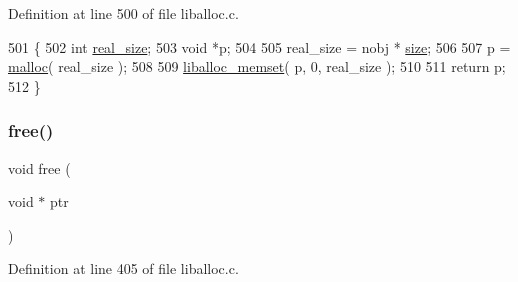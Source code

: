 Definition at line 500 of file liballoc.\+c.


\begin{DoxyCode}
501 \{
502        \textcolor{keywordtype}{int} \hyperlink{a00095_ad22b1c69bdce419783ac165f7f354245_ad22b1c69bdce419783ac165f7f354245}{real\_size};
503        \textcolor{keywordtype}{void} *p;
504 
505        real\_size = nobj * \hyperlink{a00095_a29b056a39f6022d32468e7913e6df936_a29b056a39f6022d32468e7913e6df936}{size};
506        
507        p = \hyperlink{a00023_a7ac38fce3243a7dcf448301ee9ffd392_a7ac38fce3243a7dcf448301ee9ffd392}{malloc}( real\_size );
508 
509        \hyperlink{a00023_ad824e94da51543e1febb05f96f0083ba_ad824e94da51543e1febb05f96f0083ba}{liballoc\_memset}( p, 0, real\_size );
510 
511        \textcolor{keywordflow}{return} p;
512 \}
\end{DoxyCode}
\mbox{\label{a00023_afbedc913aa4651b3c3b4b3aecd9b4711_afbedc913aa4651b3c3b4b3aecd9b4711}} 
\subsubsection{\texorpdfstring{free()}{free()}}
{\footnotesize\ttfamily void free (\begin{DoxyParamCaption}\item[{void $\ast$}]{ptr }\end{DoxyParamCaption})}



Definition at line 405 of file liballoc.\+c.



